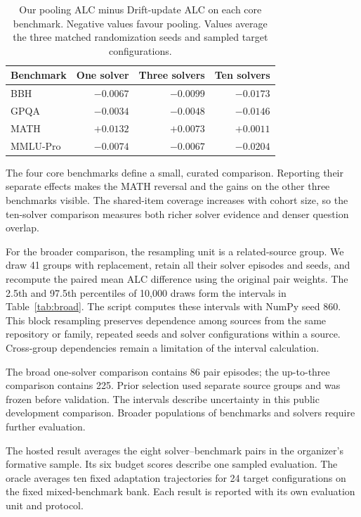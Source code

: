 \documentclass{article}
\begin{document}
\begin{table}[ht]\centering
\caption{Our pooling ALC minus Drift-update ALC on each core benchmark. Negative values favour pooling. Values average the three matched randomization seeds and sampled target configurations.}
\label{tab:paired}
\begin{tabular}{lrrr}\toprule
Benchmark & One solver & Three solvers & Ten solvers\\\midrule
BBH & $-0.0067$ & $-0.0099$ & $-0.0173$\\
GPQA & $-0.0034$ & $-0.0048$ & $-0.0146$\\
MATH & $+0.0132$ & $+0.0073$ & $+0.0011$\\
MMLU-Pro & $-0.0074$ & $-0.0067$ & $-0.0204$\\
\bottomrule\end{tabular}\end{table}

The four core benchmarks define a small, curated comparison. Reporting their separate effects makes the MATH reversal and the gains on the other three benchmarks visible. The shared-item coverage increases with cohort size, so the ten-solver comparison measures both richer solver evidence and denser question overlap.

For the broader comparison, the resampling unit is a related-source group. We draw 41 groups with replacement, retain all their solver episodes and seeds, and recompute the paired mean ALC difference using the original pair weights. The 2.5th and 97.5th percentiles of 10,000 draws form the intervals in Table~\ref{tab:broad}. The script  computes these intervals with NumPy seed 860. This block resampling preserves dependence among sources from the same repository or family, repeated seeds and solver configurations within a source. Cross-group dependencies remain a limitation of the interval calculation.

The broad one-solver comparison contains 86 pair episodes; the up-to-three comparison contains 225. Prior selection used separate source groups and was frozen before validation. The intervals describe uncertainty in this public development comparison. Broader populations of benchmarks and solvers require further evaluation.

The hosted result averages the eight solver--benchmark pairs in the organizer's formative sample. Its six budget scores describe one sampled evaluation. The oracle averages ten fixed adaptation trajectories for 24 target configurations on the fixed mixed-benchmark bank. Each result is reported with its own evaluation unit and protocol.
\end{document}
